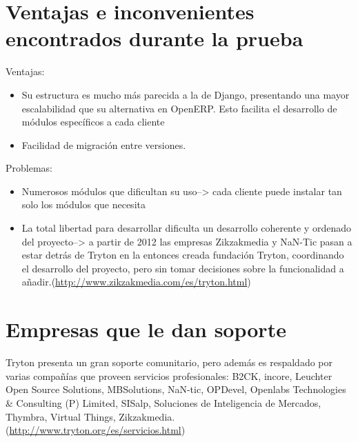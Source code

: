 \documentclass{article}
\begin{document}
\section{Ventajas e inconvenientes encontrados durante la prueba}
Ventajas:
\begin{itemize}
    \item Su estructura es mucho más parecida a la de Django, presentando una mayor escalabilidad que su alternativa en OpenERP. Esto facilita el desarrollo de módulos específicos a cada cliente
    \item Facilidad de migración entre versiones.
\end{itemize}

Problemas:
\begin{itemize}
    \item Numerosos módulos que dificultan su uso--> cada cliente puede instalar tan solo los módulos que necesita
    \item La total libertad para desarrollar dificulta un desarrollo coherente y ordenado del proyecto--> a partir de 2012 las empresas Zikzakmedia y NaN-Tic pasan a estar detrás de Tryton en la entonces creada fundación Tryton, coordinando el desarrollo del proyecto, pero sin tomar decisiones sobre la funcionalidad a añadir.(\url{http://www.zikzakmedia.com/es/tryton.html})
\end{itemize}


\section{Empresas que le dan soporte}

Tryton presenta un gran soporte comunitario, pero además es respaldado por varias compañías que proveen servicios profesionales:
B2CK, incore, Leuchter Open Source Solutions, MBSolutions, NaN-tic, OPDevel, Openlabs Technologies  \& Consulting (P) Limited, SISalp, Soluciones de Inteligencia de Mercados, Thymbra,
Virtual Things, Zikzakmedia.(\url{http://www.tryton.org/es/servicios.html})

\end{document}
